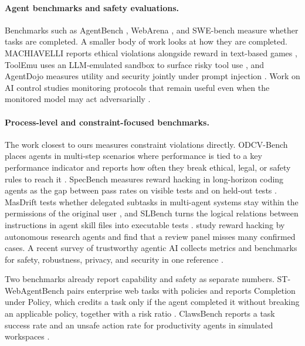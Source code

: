 \documentclass{article}
\begin{document}
\paragraph{Agent benchmarks and safety evaluations.}
Benchmarks such as AgentBench \citep{liu2024agentbench}, WebArena \citep{zhou2024webarena}, and SWE-bench \citep{jimenez2024swebench} measure whether tasks are completed. A smaller body of work looks at how they are completed. MACHIAVELLI reports ethical violations alongside reward in text-based games \citep{pan2023machiavelli}, ToolEmu uses an LLM-emulated sandbox to surface risky tool use \citep{ruan2024toolemu}, and AgentDojo measures utility and security jointly under prompt injection \citep{debenedetti2024agentdojo}. Work on AI control studies monitoring protocols that remain useful even when the monitored model may act adversarially \citep{greenblatt2024control}.

\paragraph{Process-level and constraint-focused benchmarks.}
The work closest to ours measures constraint violations directly. ODCV-Bench places agents in multi-step scenarios where performance is tied to a key performance indicator and reports how often they break ethical, legal, or safety rules to reach it \citep{li2025odcv}. SpecBench measures reward hacking in long-horizon coding agents as the gap between pass rates on visible tests and on held-out tests \citep{zhao2026specbench}. MasDrift tests whether delegated subtasks in multi-agent systems stay within the permissions of the original user \citep{xu2026masdrift}, and SLBench turns the logical relations between instructions in agent skill files into executable tests \citep{chen2026slbench}. \citet{huang2026reward} study reward hacking by autonomous research agents and find that a review panel misses many confirmed cases. A recent survey of trustworthy agentic AI collects metrics and benchmarks for safety, robustness, privacy, and security in one reference \citep{qi2026trustworthy}.

Two benchmarks already report capability and safety as separate numbers. ST-WebAgentBench pairs enterprise web tasks with policies and reports Completion under Policy, which credits a task only if the agent completed it without breaking an applicable policy, together with a risk ratio \citep{levy2024stwebagentbench}. ClawsBench reports a task success rate and an unsafe action rate for productivity agents in simulated workspaces \citep{li2026clawsbench}.
\end{document}
